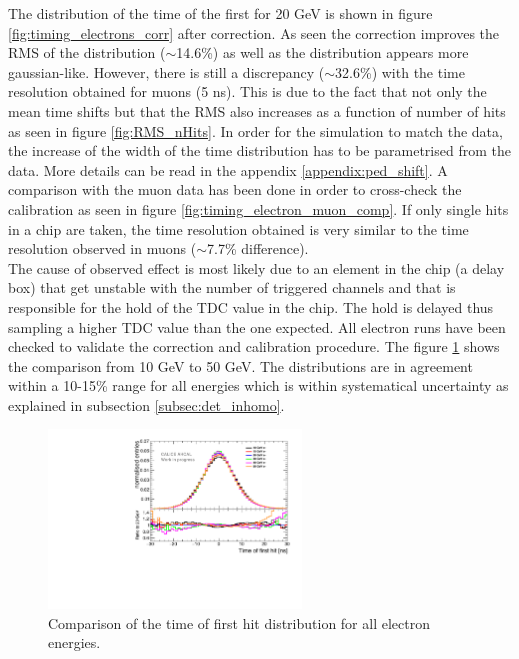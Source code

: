 \documentclass[twoside,a4paper,11pt]{article}
\begin{document}
The distribution of the time of the first for 20 GeV is shown in figure \ref{fig:timing_electrons_corr} after correction. As seen the correction improves the RMS of the distribution ($\sim$14.6\%) as well as the distribution appears more gaussian-like. However, there is still a discrepancy ($\sim$32.6\%) with the time resolution obtained for muons (5 ns). This is due to the fact that not only the mean time shifts but that the RMS also increases as a function of number of hits as seen in figure \ref{fig:RMS_nHits}. In order for the simulation to match the data, the increase of the width of the time distribution has to be parametrised from the data. More details can be read in the appendix \ref{appendix:ped_shift}. A comparison with the muon data has been done in order to cross-check the calibration as seen in figure \ref{fig:timing_electron_muon_comp}. If only single hits in a chip are taken, the time resolution obtained is very similar to the time resolution observed in muons ($\sim$7.7\% difference).\\
The cause of observed effect is most likely due to an element in the chip (a delay box) that get unstable with the number of triggered channels and that is responsible for the hold of the TDC value in the chip. The hold is delayed thus sampling a higher TDC value than the one expected. All electron runs have been checked to validate the correction and calibration procedure. The figure \ref{fig:all_electron_energies} shows the comparison from 10 GeV to 50 GeV. The distributions are in agreement within a 10-15\% range for all energies which is within systematical uncertainty as explained in subsection \ref{subsec:det_inhomo}.

\begin{figure}[htbp]
\begin{center}
\includegraphics[width=0.6\textwidth]{fig/Electrons/ComparisonDataEnergies.pdf}
\caption{Comparison of the time of first hit distribution for all electron energies.}
\label{fig:all_electron_energies}
\end{center}
\end{figure}
\end{document}

